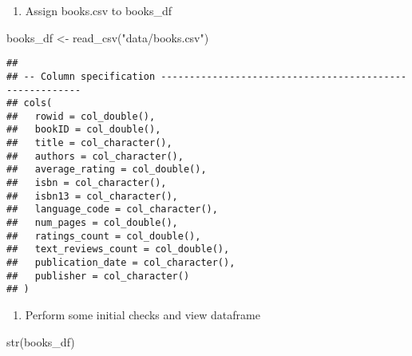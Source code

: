 \documentclass[
]{article}
\newenvironment{Shaded}{\begin{snugshade}}{\end{snugshade}}
\newcommand{\FunctionTok}[1]{\textcolor[rgb]{0.00,0.00,0.00}{#1}}
\newcommand{\NormalTok}[1]{#1}
\newcommand{\OtherTok}[1]{\textcolor[rgb]{0.56,0.35,0.01}{#1}}
\newcommand{\StringTok}[1]{\textcolor[rgb]{0.31,0.60,0.02}{#1}}
\providecommand{\tightlist}{%
  \setlength{\itemsep}{0pt}\setlength{\parskip}{0pt}}
\begin{document}
\begin{enumerate}
\def\labelenumi{\arabic{enumi}.}
\setcounter{enumi}{1}
\tightlist
\item
  Assign books.csv to books\_df
\end{enumerate}

\begin{Shaded}
\begin{Highlighting}[]
\NormalTok{books\_df }\OtherTok{\textless{}{-}} \FunctionTok{read\_csv}\NormalTok{(}\StringTok{"data/books.csv"}\NormalTok{)}
\end{Highlighting}
\end{Shaded}

\begin{verbatim}
## 
## -- Column specification --------------------------------------------------------
## cols(
##   rowid = col_double(),
##   bookID = col_double(),
##   title = col_character(),
##   authors = col_character(),
##   average_rating = col_double(),
##   isbn = col_character(),
##   isbn13 = col_character(),
##   language_code = col_character(),
##   num_pages = col_double(),
##   ratings_count = col_double(),
##   text_reviews_count = col_double(),
##   publication_date = col_character(),
##   publisher = col_character()
## )
\end{verbatim}

\begin{enumerate}
\def\labelenumi{\arabic{enumi}.}
\setcounter{enumi}{2}
\tightlist
\item
  Perform some initial checks and view dataframe
\end{enumerate}

\begin{Shaded}
\begin{Highlighting}[]
\FunctionTok{str}\NormalTok{(books\_df)}
\end{Highlighting}
\end{Shaded}
\end{document}
